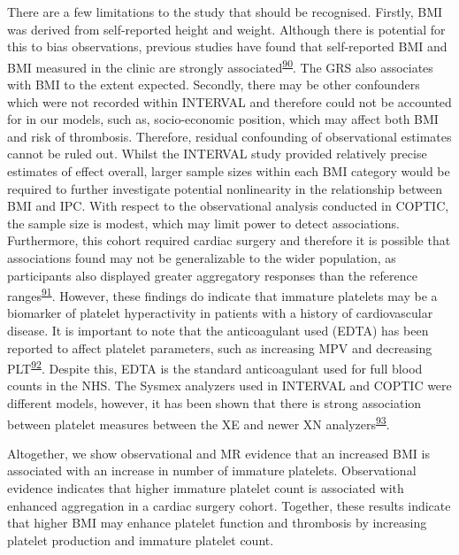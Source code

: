 \documentclass[11pt,twoside]{bristolthesis}
\begin{document}
There are a few limitations to the study that should be recognised. Firstly, BMI was derived from self-reported height and weight. Although there is potential for this to bias observations, previous studies have found that self-reported BMI and BMI measured in the clinic are strongly associated\textsuperscript{\protect\hyperlink{ref-Nikolaou2017}{90}}. The GRS also associates with BMI to the extent expected. Secondly, there may be other confounders which were not recorded within INTERVAL and therefore could not be accounted for in our models, such as, socio-economic position, which may affect both BMI and risk of thrombosis. Therefore, residual confounding of observational estimates cannot be ruled out. Whilst the INTERVAL study provided relatively precise estimates of effect overall, larger sample sizes within each BMI category would be required to further investigate potential nonlinearity in the relationship between BMI and IPC. With respect to the observational analysis conducted in COPTIC, the sample size is modest, which may limit power to detect associations. Furthermore, this cohort required cardiac surgery and therefore it is possible that associations found may not be generalizable to the wider population, as participants also displayed greater aggregatory responses than the reference ranges\textsuperscript{\protect\hyperlink{ref-Marcucci2015}{91}}. However, these findings do indicate that immature platelets may be a biomarker of platelet hyperactivity in patients with a history of cardiovascular disease. It is important to note that the anticoagulant used (EDTA) has been reported to affect platelet parameters, such as increasing MPV and decreasing PLT\textsuperscript{\protect\hyperlink{ref-Mannuuxdf2020}{92}}. Despite this, EDTA is the standard anticoagulant used for full blood counts in the NHS. The Sysmex analyzers used in INTERVAL and COPTIC were different models, however, it has been shown that there is strong association between platelet measures between the XE and newer XN analyzers\textsuperscript{\protect\hyperlink{ref-Briggs2012}{93}}.

Altogether, we show observational and MR evidence that an increased BMI is associated with an increase in number of immature platelets. Observational evidence indicates that higher immature platelet count is associated with enhanced aggregation in a cardiac surgery cohort. Together, these results indicate that higher BMI may enhance platelet function and thrombosis by increasing platelet production and immature platelet count.
\end{document}
